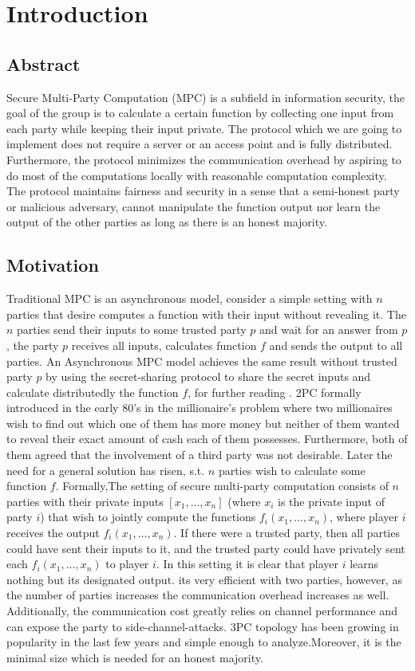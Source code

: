 \documentclass[12pt]{article}
\begin{document}
\section{Introduction}

\subsection{Abstract}
Secure Multi-Party Computation (MPC) is a subfield in information security, the goal of the group is to calculate a certain function by collecting one input from each party while keeping their input private. The protocol which we are going to implement does not require a server or an access point and is fully distributed. Furthermore, the protocol minimizes the communication overhead by aspiring to do most of the computations locally with reasonable computation complexity.
The protocol maintains fairness and security in a sense that a semi-honest party or malicious adversary, cannot manipulate the function output nor learn the output of the other parties as long as there is an honest majority.\hfill\break\hfill\break


\subsection{Motivation}
Traditional MPC is an asynchronous model, consider a simple setting with $n$ parties that desire computes a function with their input without revealing it. The $n$ parties send their inputs to some trusted party $p$ and wait for an answer from $p$, the party $p$ receives all inputs, calculates function $f$ and sends the output to all parties. An Asynchronous MPC model achieves the same result without trusted party $p$ by using the secret-sharing protocol to share the secret inputs and calculate distributedly the function $f$, for further reading \cite{sync_async}. 
2PC formally introduced in the early 80’s in the millionaire’s problem where two millionaires wish to find out which one of them has more money but neither of them wanted to reveal their exact amount of cash each of them possesses. Furthermore, both of them agreed that the involvement of a third party was not desirable. Later the need for a general solution has risen, s.t. $n$ parties wish to calculate some function $f$.  Formally,The setting of secure multi-party computation consists of $n$ parties with their private inputs $[x_1, \ldots ,x_n]$ (where $x_i$ is the private input of party $i$) that wish to jointly compute the functions $f_i(x_1, \ldots ,x_n)$, where player $i$ receives the output  $f_i(x_1, \ldots ,x_n)$. If there were a trusted party, then all parties could have sent their inputs to it, and the trusted party could have privately sent each  $f_i(x_1, \ldots ,x_n)$ to player $i$. In this setting it is clear that player $i$ learns nothing but its designated output. its very efficient with two parties, however, as the number of parties increases the communication overhead increases as well. Additionally, the communication cost greatly relies on channel performance and can expose the party to side-channel-attacks. 3PC topology has been growing in popularity in the last few years and  simple enough to analyze.Moreover, it is the minimal size which is needed for an honest majority.
\end{document}
